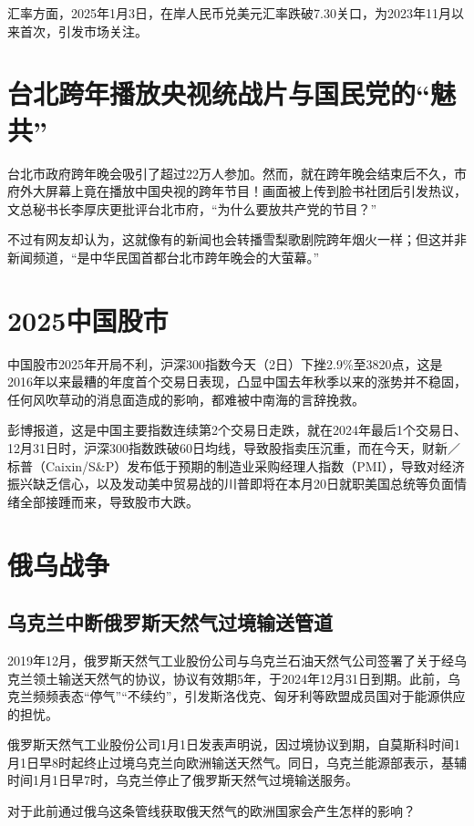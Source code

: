 汇率方面，2025年1月3日，在岸人民币兑美元汇率跌破7.30关口，为2023年11月以来首次，引发市场关注。

\section{台北跨年播放央视统战片与国民党的“魅共”}

台北市政府跨年晚会吸引了超过22万人参加。然而，就在跨年晚会结束后不久，市府外大屏幕上竟在播放中国央视的跨年节目！画面被上传到脸书社团后引发热议，文总秘书长李厚庆更批评台北市府，“为什么要放共产党的节目？”

不过有网友却认为，这就像有的新闻也会转播雪梨歌剧院跨年烟火一样；但这并非新闻频道，“是中华民国首都台北市跨年晚会的大萤幕。”

\section{2025中国股市}

中国股市2025年开局不利，沪深300指数今天（2日）下挫2.9\%至3820点，这是2016年以来最糟的年度首个交易日表现，凸显中国去年秋季以来的涨势并不稳固，任何风吹草动的消息面造成的影响，都难被中南海的言辞挽救。

彭博报道，这是中国主要指数连续第2个交易日走跌，就在2024年最后1个交易日、12月31日时，沪深300指数跌破60日均线，导致股指卖压沉重，而在今天，财新／标普（Caixin/S\&P）发布低于预期的制造业采购经理人指数（PMI），导致对经济振兴缺乏信心，以及发动美中贸易战的川普即将在本月20日就职美国总统等负面情绪全部接踵而来，导致股市大跌。

\section{俄乌战争}

\subsection{乌克兰中断俄罗斯天然气过境输送管道}

2019年12月，俄罗斯天然气工业股份公司与乌克兰石油天然气公司签署了关于经乌克兰领土输送天然气的协议，协议有效期5年，于2024年12月31日到期。此前，乌克兰频频表态“停气”“不续约”，引发斯洛伐克、匈牙利等欧盟成员国对于能源供应的担忧。

俄罗斯天然气工业股份公司1月1日发表声明说，因过境协议到期，自莫斯科时间1月1日早8时起终止过境乌克兰向欧洲输送天然气。同日，乌克兰能源部表示，基辅时间1月1日早7时，乌克兰停止了俄罗斯天然气过境输送服务。

对于此前通过俄乌这条管线获取俄天然气的欧洲国家会产生怎样的影响？

